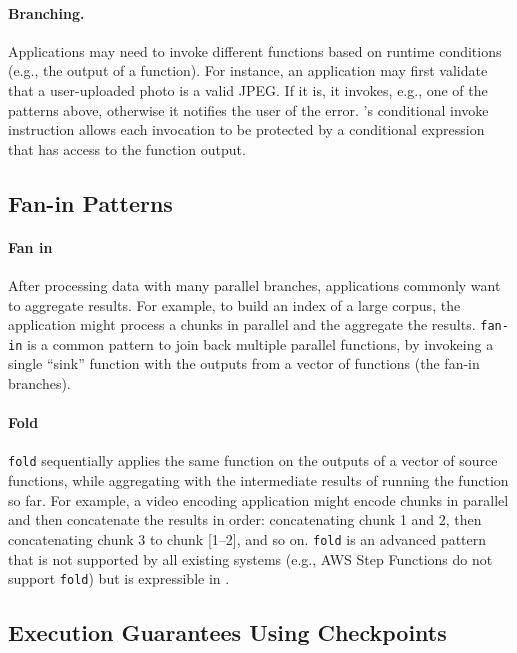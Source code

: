 \paragraph{Branching.}
Applications may need to invoke different functions based on runtime conditions
(e.g., the output of a function). For instance, an application may first
validate that a user-uploaded photo is a valid JPEG. If it is, it invokes, e.g.,
one of the patterns above, otherwise it notifies the user of the error.
\name{}'s conditional invoke instruction allows each invocation to be protected
by a conditional expression that has access to the function output.

\subsection{Fan-in Patterns}\label{sec:design:fanin}

\paragraph{Fan in}
After processing data with many parallel branches, applications commonly want to
aggregate results. For example, to build an index of a large corpus, the
application might process a chunks in parallel and the aggregate the results.
\texttt{fan-in} is a common pattern to join back multiple parallel functions, by
invokeing a single ``sink'' function with the outputs from a vector of functions
(the fan-in branches).

\paragraph{Fold}
\texttt{fold} sequentially applies the same function on the outputs of a vector
of source functions, while aggregating with the intermediate results of running
the function so far. For example, a video encoding application might encode
chunks in parallel and then concatenate the results in order: concatenating
chunk 1 and 2, then concatenating chunk 3 to chunk [1--2], and so on.
\texttt{fold} is an advanced pattern that is not supported by all existing
systems (e.g., AWS Step Functions do not support \texttt{fold}) but is
expressible in \name{}.

\subsection{Execution Guarantees Using Checkpoints}\label{sec:design:execution}

